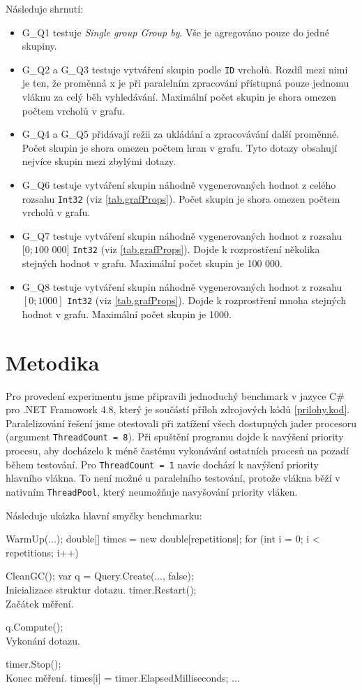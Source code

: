 Následuje shrnutí:
\begin{itemize}

\item G\_Q1 testuje \textit{Single group Group by}. Vše je agregováno pouze do jedné skupiny. 
\item G\_Q2 a G\_Q3  testuje vytváření skupin podle \verb+ID+ vrcholů. Rozdíl mezi nimi je ten, že proměnná x je při paralelním zpracování přístupná pouze jednomu vláknu za celý běh vyhledávání. Maximální počet skupin je shora omezen počtem vrcholů v grafu.
\item G\_Q4 a G\_Q5 přidávají režii za ukládání a zpracovávání další proměnné. Počet skupin je shora omezen počtem hran v grafu. Tyto dotazy obsahují nejvíce skupin mezi zbylými dotazy.
\item G\_Q6 testuje vytváření skupin náhodně vygenerovaných hodnot z celého rozsahu \verb+Int32+ (viz \ref{tab.grafProps}). Počet skupin je shora omezen počtem vrcholů v grafu.
\item G\_Q7 testuje vytváření skupin náhodně vygenerovaných hodnot z rozsahu $[0; 100$ $000]$ \verb+Int32+ (viz \ref{tab.grafProps}). Dojde k rozprostření několika stejných hodnot v grafu. Maximální počet skupin je 100 000.
\item G\_Q8  testuje vytváření skupin náhodně vygenerovaných hodnot z rozsahu $[0; 1000]$ \verb+Int32+ (viz \ref{tab.grafProps}). Dojde k rozprostření mnoha stejných hodnot v grafu. Maximální počet skupin je 1000.

\end{itemize}

\section{Metodika}
Pro provedení experimentu jsme připravili jednoduchý benchmark v jazyce C\# pro .NET Framowork 4.8, který je součástí příloh zdrojových kódů \ref{prilohy.kod}.
Paralelizování řešení jsme otestovali při zatížení všech dostupných jader procesoru (argument \verb+ThreadCount = 8+).
Při spuštění programu dojde k navýšení priority procesu, aby docházelo k méně častému vykonávání ostatních procesů na pozadí během testování. 
Pro \verb+ThreadCount = 1+ navíc dochází k navýšení priority hlavního vlákna. 
To není možné u paralelního testování, protože vlákna běží v nativním \verb+ThreadPool+, který neumožňuje navyšování priority vláken.

Následuje ukázka hlavní smyčky benchmarku:

\begin{code}
WarmUp(...);
double[] times = new double[repetitions];
for (int i = 0; i < repetitions; i++) {
    CleanGC();
    var q = Query.Create(..., false);  \\ Inicializace struktur dotazu.
    timer.Restart();  \\ Začátek měření.

    q.Compute();      \\ Vykonání dotazu.
    
    timer.Stop();     \\ Konec měření. 
    times[i] = timer.ElapsedMilliseconds;
    ...
}
\end{code}

